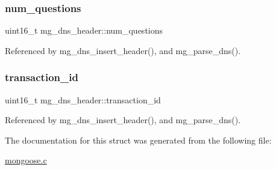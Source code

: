 \mbox{\label{structmg__dns__header_a156d3f5926d1fdb24bcbcba1f273c59a_a156d3f5926d1fdb24bcbcba1f273c59a}} 
\subsubsection{\texorpdfstring{num\+\_\+questions}{num\_questions}}
{\footnotesize\ttfamily uint16\+\_\+t mg\+\_\+dns\+\_\+header\+::num\+\_\+questions}



Referenced by mg\+\_\+dns\+\_\+insert\+\_\+header(), and mg\+\_\+parse\+\_\+dns().

\mbox{\label{structmg__dns__header_a00963ebb1d83de6f48f7733679c4b8a7_a00963ebb1d83de6f48f7733679c4b8a7}} 
\subsubsection{\texorpdfstring{transaction\+\_\+id}{transaction\_id}}
{\footnotesize\ttfamily uint16\+\_\+t mg\+\_\+dns\+\_\+header\+::transaction\+\_\+id}



Referenced by mg\+\_\+dns\+\_\+insert\+\_\+header(), and mg\+\_\+parse\+\_\+dns().



The documentation for this struct was generated from the following file\+:\begin{DoxyCompactItemize}
\item 
\hyperlink{mongoose_8c}{mongoose.\+c}\end{DoxyCompactItemize}

